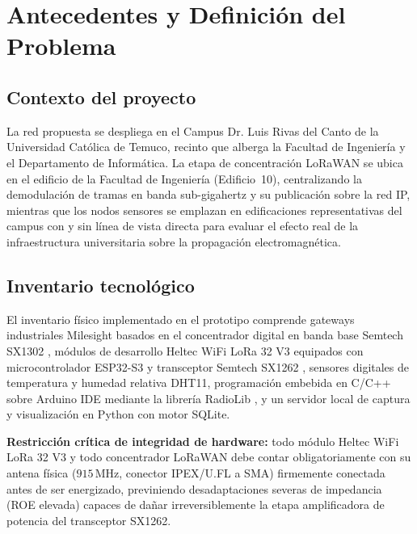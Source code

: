 \documentclass[12pt,oneside,openany,spanish,oldfontcommands]{memoir}
\begin{document}
\chapter{Antecedentes y Definición del Problema}

\section{Contexto del proyecto}

La red propuesta se despliega en el Campus Dr. Luis Rivas del Canto de la Universidad Católica de
Temuco, recinto que alberga la Facultad de Ingeniería y el Departamento de Informática. La etapa
de concentración LoRaWAN se ubica en el edificio de la Facultad de Ingeniería (Edificio~10),
centralizando la demodulación de tramas en banda sub-gigahertz y su publicación sobre la red IP,
mientras que los nodos sensores se emplazan en edificaciones representativas del campus con y sin
línea de vista directa para evaluar el efecto real de la infraestructura universitaria sobre la
propagación electromagnética.

\section{Inventario tecnológico}

El inventario físico implementado en el prototipo comprende gateways industriales Milesight basados
en el concentrador digital en banda base Semtech SX1302 \parencite{semtech_sx1302,milesight_ug63,milesight_ug65},
módulos de desarrollo Heltec WiFi LoRa 32 V3 equipados con microcontrolador ESP32-S3 y transceptor
Semtech SX1262 \parencite{heltec_v3,semtech_sx1262}, sensores digitales de temperatura y humedad
relativa DHT11, programación embebida en C/C++ sobre Arduino IDE mediante la librería RadioLib
\parencite{radiolib}, y un servidor local de captura y visualización en Python con motor SQLite.

\textbf{Restricción crítica de integridad de hardware:} todo módulo Heltec WiFi LoRa 32 V3 y todo
concentrador LoRaWAN debe contar obligatoriamente con su antena física ($915\,\text{MHz}$, conector
IPEX/U.FL a SMA) firmemente conectada antes de ser energizado, previniendo desadaptaciones severas
de impedancia (ROE elevada) capaces de dañar irreversiblemente la etapa amplificadora de potencia
del transceptor SX1262.
\end{document}
